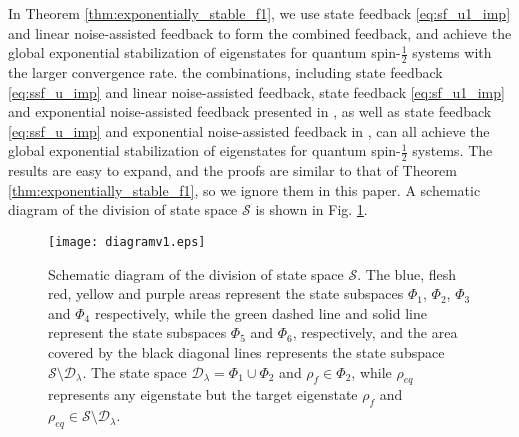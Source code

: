 \documentclass[]{elsarticle}
\begin{document}
\begin{rmk}\label{rmk:comment_of_other_strategies}
	In Theorem \ref{thm:exponentially_stable_f1}, we use state feedback \eqref{eq:sf_u1_imp} and linear	noise-assisted feedback to form the combined feedback, and achieve the global exponential stabilization of eigenstates for quantum spin-$\frac{1}{2}$ systems with the larger convergence rate. {} the combinations, including state feedback \eqref{eq:ssf_u_imp} and linear noise-assisted feedback, state feedback \eqref{eq:sf_u1_imp} and exponential noise-assisted feedback presented in \cite{WSJZJ2021}, as well as state feedback \eqref{eq:ssf_u_imp} and exponential noise-assisted feedback in \cite{WSJZJ2021},  can all  achieve the global exponential stabilization of eigenstates for quantum spin-$\frac{1}{2}$ systems. The results are easy to expand, and the proofs are similar to that of Theorem \ref{thm:exponentially_stable_f1}, so we ignore them in this paper. A schematic diagram of the division of state space $\mathcal{S}$ is shown in Fig. \ref{figur:diagram}. 
	\begin{figure}[!t]
		\centering
		\texttt{[image: diagramv1.eps]}
		\caption{Schematic diagram of the division of state space $\mathcal{S}$. The blue, flesh red, yellow and purple areas represent the state subspaces $\Phi_1$, $\Phi_2$, $\Phi_3$ and $\Phi_4$ respectively, while the green dashed line and solid line represent the state subspaces $\Phi_5$ and $\Phi_6$, respectively, and the area covered by the black diagonal lines represents the state subspace $\mathcal{S}\setminus\mathcal{D}_\lambda$. The state space $\mathcal{D}_\lambda=\Phi_1\cup\Phi_2$ and $\rho_{f}\in \Phi_2$, while $\rho_{eq}$ represents any eigenstate but the target eigenstate $\rho_{f}$ and $\rho_{eq}\in \mathcal{S}\setminus\mathcal{D}_\lambda$.}
		\label{figur:diagram}
	\end{figure}
\end{rmk}
\end{document}
